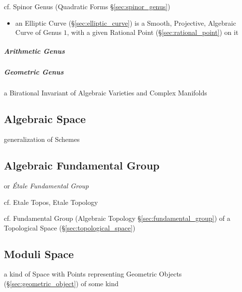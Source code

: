 \fist cf. Spinor Genus (Quadratic Forms \S\ref{sec:spinor_genus})

\begin{itemize}
  \item an Elliptic Curve (\S\ref{sec:elliptic_curve}) is a Smooth, Projective,
    Algebraic Curve of Genus $1$, with a given Rational Point
    (\S\ref{sec:rational_point}) on it
\end{itemize}



\subparagraph{Arithmetic Genus}\label{sec:arithmetic_genus}\hfill

\subparagraph{Geometric Genus}\label{sec:geometric_genus}\hfill

a Birational Invariant of Algebraic Varieties and Complex Manifolds



\subsection{Algebraic Space}\label{sec:algebraic_space}

generalization of Schemes



\subsection{Algebraic Fundamental Group}\label{sec:algebraic_fundamental_group}

or \emph{\'Etale Fundamental Group}

cf. Etale Topos, Etale Topology

cf. Fundamental Group (Algebraic Topology \S\ref{sec:fundamental_group}) of a
Topological Space (\S\ref{sec:topological_space})



\subsection{Moduli Space}\label{sec:moduli_space}

a kind of Space with Points representing Geometric Objects
(\S\ref{sec:geometric_object}) of some kind

